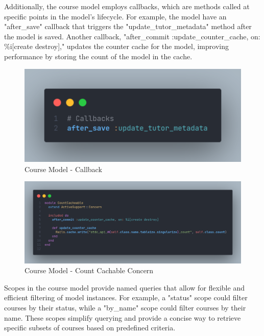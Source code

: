 \begin{justify}
        \vspace{0.25cm}
        \newendline Additionally, the course model employs callbacks, which are methods called at specific points in the model's lifecycle. For example, the model have an "after\_save" callback that triggers the "update\_tutor\_metadata" method after the model is saved. Another callback, "after\_commit :update\_counter\_cache, on: \%i[create destroy]," updates the counter cache for the model, improving performance by storing the count of the model in the cache.
        
        \begin{figure}[H]
            \centerline{\includegraphics[width=150mm,scale=1]{figures/implementation_and_testing/implementation/backend/course_callbacks.png}}
            \caption{Course Model - Callback}
        \end{figure}

        \begin{figure}[H]
            \centerline{\includegraphics[width=150mm,scale=1]{figures/implementation_and_testing/implementation/backend/course_count_concern.png}}
            \caption{Course Model - Count Cachable Concern}
        \end{figure}

        \vspace{0.25cm}
        \newendline Scopes in the course model provide named queries that allow for flexible and efficient filtering of model instances. For example, a "status" scope could filter courses by their status, while a "by\_name" scope could filter courses by their name. These scopes simplify querying and provide a concise way to retrieve specific subsets of courses based on predefined criteria.
        

\end{justify}
